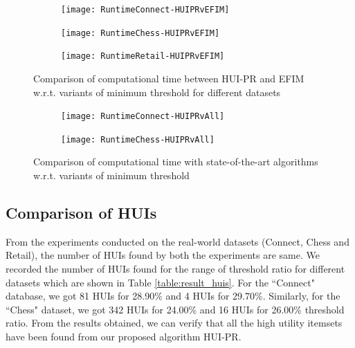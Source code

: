 \documentclass[11pt,openright]{report}
\begin{document}
\begin{figure}
	\begin{subfigure}{\textwidth}
		\centering 
		\texttt{[image: RuntimeConnect-HUIPRvEFIM]}
		\label{fig:graph-connect}
	\end{subfigure}    
	\begin{subfigure}{\textwidth}
		\centering
		\texttt{[image: RuntimeChess-HUIPRvEFIM]}
		\label{fig:graph-chess}
	\end{subfigure}
	\begin{subfigure}{\textwidth}
		\centering 
		\texttt{[image: RuntimeRetail-HUIPRvEFIM]}
		\label{fig:graph-retail}
	\end{subfigure}
	\caption{Comparison of computational time between HUI-PR and EFIM w.r.t. variants of minimum threshold for different datasets}
	\label{fig:graph-comparison}
\end{figure}
\begin{figure}
	\centering 
	\begin{subfigure}[b]{\textwidth}
		\centering
		 \texttt{[image: RuntimeConnect-HUIPRvAll]}
		\label{fig:graph-connect-comparison}
		\bigskip
	\end{subfigure}
	\begin{subfigure}[b]{\textwidth}
		\centering
		\texttt{[image: RuntimeChess-HUIPRvAll]}
		\label{fig:graph-chess-comparison}
	\end{subfigure}
	\caption{Comparison of computational time with state-of-the-art algorithms w.r.t. variants of minimum threshold}
	\label{fig:graph-multiple-comparison}
\end{figure}


\subsection{Comparison of HUIs}
From the experiments conducted on the real-world datasets (Connect, Chess and Retail), the number of HUIs found by both the experiments are same. We recorded the number of HUIs found for the range of threshold ratio for different datasets which are shown in Table \ref{table:result_huis}. For the ``Connect" database, we got 81 HUIs for 28.90\% and 4 HUIs for 29.70\%. Similarly, for the ``Chess" dataset, we got 342 HUIs for 24.00\% and 16 HUIs for 26.00\% threshold ratio. From the results obtained, we can verify that all the high utility itemsets have been found from our proposed algorithm HUI-PR.
\end{document}
